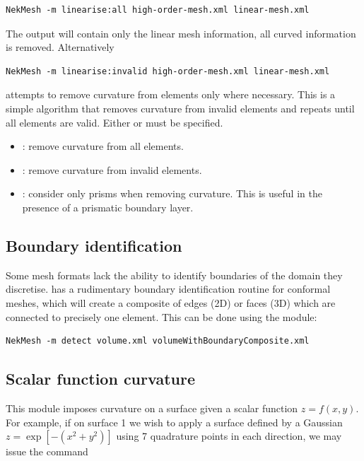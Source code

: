 \begin{lstlisting}[style=BashInputStyle]
  NekMesh -m linearise:all high-order-mesh.xml linear-mesh.xml
\end{lstlisting}

The output will contain only the linear mesh information, all curved information
is removed. Alternatively

\begin{lstlisting}[style=BashInputStyle]
  NekMesh -m linearise:invalid high-order-mesh.xml linear-mesh.xml
\end{lstlisting}

attempts to remove curvature from elements only where necessary. This is a
simple algorithm that removes curvature from invalid elements and repeats until
all elements are valid. Either  or  must be specified.

\begin{itemize}
  \item {}: remove curvature from all elements.
  \item {}: remove curvature from invalid elements.
  \item {}: consider only prisms when removing curvature. This is
  useful in the presence of a prismatic boundary layer.
\end{itemize}

\subsection{Boundary identification}

Some mesh formats lack the ability to identify boundaries of the domain they
discretise. \nm has a rudimentary boundary identification routine for conformal
meshes, which will create a composite of edges (2D) or faces (3D) which are
connected to precisely one element. This can be done using the 
module:

\begin{lstlisting}[style=BashInputStyle]
  NekMesh -m detect volume.xml volumeWithBoundaryComposite.xml
\end{lstlisting}

\subsection{Scalar function curvature}

This module imposes curvature on a surface given a scalar function
$z=f(x,y)$. For example, if on surface 1 we wish to apply a surface defined by a
Gaussian $z = \exp[-(x^2+y^2)]$ using 7 quadrature points in each direction, we
may issue the command

